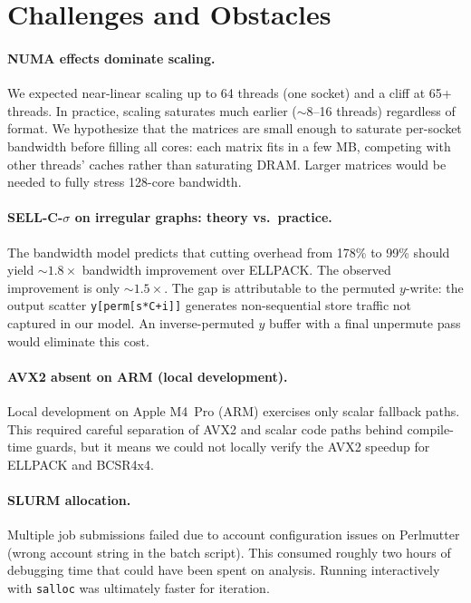 \documentclass[11pt]{article}
\begin{document}
\section{Challenges and Obstacles}

\paragraph{NUMA effects dominate scaling.}
We expected near-linear scaling up to 64 threads (one socket) and a cliff
at 65+ threads.  In practice, scaling saturates much earlier ($\sim$8--16
threads) regardless of format.  We hypothesize that the matrices are small
enough to saturate per-socket bandwidth before filling all cores: each
matrix fits in a few MB, competing with other threads' caches rather than
saturating DRAM.  Larger matrices would be needed to fully stress 128-core
bandwidth.

\paragraph{SELL-C-$\sigma$ on irregular graphs: theory vs.\ practice.}
The bandwidth model predicts that cutting overhead from 178\% to 99\%
should yield $\sim 1.8\times$ bandwidth improvement over ELLPACK.  The
observed improvement is only $\sim 1.5\times$.  The gap is attributable
to the permuted $y$-write: the output scatter \texttt{y[perm[s*C+i]]}
generates non-sequential store traffic not captured in our model.  An
inverse-permuted $y$ buffer with a final unpermute pass would eliminate
this cost.

\paragraph{AVX2 absent on ARM (local development).}
Local development on Apple M4~Pro (ARM) exercises only scalar fallback
paths.  This required careful separation of AVX2 and scalar code paths
behind compile-time guards, but it means we could not locally verify the
AVX2 speedup for ELLPACK and BCSR4x4.

\paragraph{SLURM allocation.}
Multiple job submissions failed due to account configuration issues on
Perlmutter (wrong account string in the batch script).  This consumed
roughly two hours of debugging time that could have been spent on analysis.
Running interactively with \texttt{salloc} was ultimately faster for
iteration.
\end{document}
